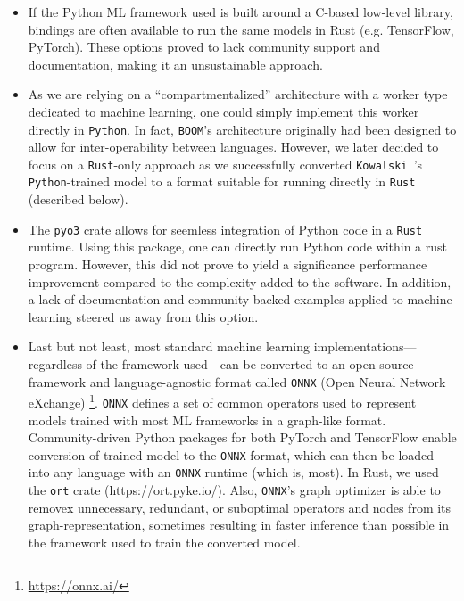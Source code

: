 \documentclass[twocolumn]{aastex631}
\newcommand{\kowalski}{\texttt{Kowalski }}
\begin{document}
\begin{itemize}
    \item If the Python ML framework used is built around a C-based low-level
        library, bindings are often available to run the same models in Rust
        (e.g. TensorFlow, PyTorch). These options proved to lack community
        support and documentation, making it an unsustainable approach.
    \item As we are relying on a ``compartmentalized'' architecture with a
        worker type dedicated to machine learning, one could simply implement this worker directly in
        \texttt{Python}. In fact, \texttt{BOOM}'s architecture originally had
        been designed to allow for inter-operability between languages. However, we
        later decided to focus on a \texttt{Rust}-only approach as we
        successfully converted \kowalski's \texttt{Python}-trained model
        to a format suitable for running directly in \texttt{Rust} (described
        below).
    \item The \texttt{pyo3} crate allows for seemless integration of Python code
        in a \texttt{Rust} runtime. Using this package, one can directly run
        Python code within a rust program. However, this did not prove to yield
        a significance performance improvement compared to the complexity added
        to the software. In addition, a lack of documentation and
        community-backed examples applied to machine learning steered us away from this option.
    \item Last but not least, most standard machine learning
        implementations---regardless of the framework used---can be converted to
        an open-source framework and language-agnostic format called \texttt{ONNX} (Open
        Neural Network eXchange) \footnote{\url{https://onnx.ai/}}.
        \texttt{ONNX} defines a set of common
        operators used to represent models trained with most ML frameworks in a
        graph-like format. Community-driven Python packages for both PyTorch and
        TensorFlow enable conversion of trained model to the
        \texttt{ONNX} format, which can then be loaded into any language
        with an \texttt{ONNX} runtime (which is, most). In
        Rust, we used the \texttt{ort} crate (https://ort.pyke.io/). Also, \texttt{ONNX}'s graph optimizer is able to removex
        unnecessary, redundant, or suboptimal operators and nodes from its graph-representation, sometimes resulting in faster inference than possible in the framework used to train the converted model.
\end{itemize}
\end{document}
